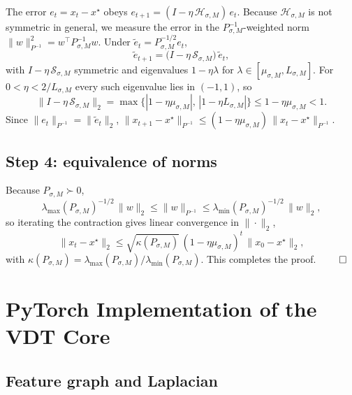 \documentclass[12pt,a4paper]{article}
\theoremstyle{plain}
\theoremstyle{definition}
\theoremstyle{remark}
\newcommand{\1}{\mathbf{1}}
\begin{document}
The error $e_t = x_t - x^\star$ obeys
$e_{t+1} = (I - \eta\,\mathcal{H}_{\sigma,M})\, e_t$. Because
$\mathcal{H}_{\sigma,M}$ is not symmetric in general, we measure the
error in the $P_{\sigma,M}^{-1}$-weighted norm
$\|w\|_{P^{-1}}^2 = w^\top P_{\sigma,M}^{-1} w$. Under
$\tilde e_t = P_{\sigma,M}^{-1/2} e_t$,
\[
    \tilde e_{t+1} = \bigl(I - \eta\, \mathcal{S}_{\sigma,M}\bigr)\,\tilde e_t,
\]
with $I - \eta\,\mathcal{S}_{\sigma,M}$ symmetric and eigenvalues
$1 - \eta\lambda$ for $\lambda \in [\mu_{\sigma,M}, L_{\sigma,M}]$. For
$0 < \eta < 2/L_{\sigma,M}$ every such eigenvalue lies in $(-1,1)$, so
\[
    \|I - \eta\,\mathcal{S}_{\sigma,M}\|_2
    = \max\bigl\{|1-\eta\mu_{\sigma,M}|,\,|1-\eta L_{\sigma,M}|\bigr\}
    \le 1 - \eta\mu_{\sigma,M} < 1.
\]
Since $\|e_t\|_{P^{-1}} = \|\tilde e_t\|_2$,
$\|x_{t+1} - x^\star\|_{P^{-1}} \le (1 - \eta\mu_{\sigma,M})\,\|x_t - x^\star\|_{P^{-1}}$.

\subsection{Step 4: equivalence of norms}

Because $P_{\sigma,M} \succ 0$,
\[
    \lambda_{\max}(P_{\sigma,M})^{-1/2}\,\|w\|_2
    \le \|w\|_{P^{-1}}
    \le \lambda_{\min}(P_{\sigma,M})^{-1/2}\,\|w\|_2 ,
\]
so iterating the contraction gives linear convergence in $\|\cdot\|_2$,
\[
    \|x_t - x^\star\|_2
    \le \sqrt{\kappa(P_{\sigma,M})}\,
         (1 - \eta\mu_{\sigma,M})^t\,
         \|x_0 - x^\star\|_2 ,
\]
with $\kappa(P_{\sigma,M}) = \lambda_{\max}(P_{\sigma,M})/\lambda_{\min}(P_{\sigma,M})$.
This completes the proof.
\hfill$\qed$

\section{PyTorch Implementation of the VDT Core}
\label{app:pytorch_vdt}

\subsection{Feature graph and Laplacian}
\end{document}
